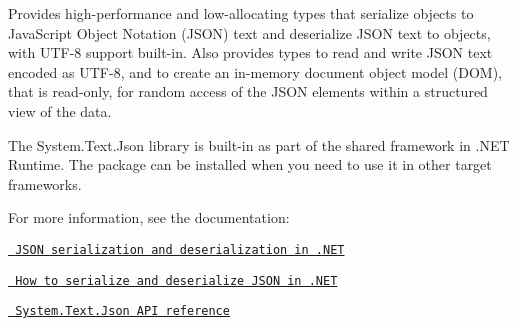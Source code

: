 Provides high-\/performance and low-\/allocating types that serialize objects to Java\+Script Object Notation (JSON) text and deserialize JSON text to objects, with UTF-\/8 support built-\/in. Also provides types to read and write JSON text encoded as UTF-\/8, and to create an in-\/memory document object model (DOM), that is read-\/only, for random access of the JSON elements within a structured view of the data.

The {\ttfamily System.\+Text.\+Json} library is built-\/in as part of the shared framework in .NET Runtime. The package can be installed when you need to use it in other target frameworks.

For more information, see the documentation\+:


\begin{DoxyItemize}
\item \href{https://docs.microsoft.com/dotnet/standard/serialization/system-text-json-overview}{\texttt{ JSON serialization and deserialization in .NET}}
\item \href{https://docs.microsoft.com/dotnet/standard/serialization/system-text-json-how-to}{\texttt{ How to serialize and deserialize JSON in .NET}}
\item \href{https://docs.microsoft.com/dotnet/api/system.text.json}{\texttt{ System.\+Text.\+Json API reference}} 
\end{DoxyItemize}